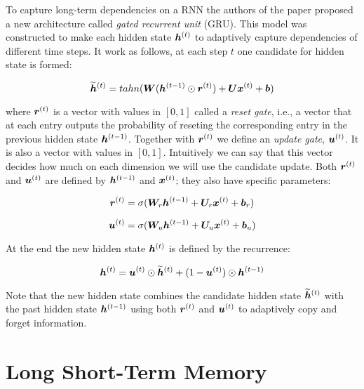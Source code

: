 To capture long-term dependencies on a RNN  the authors of the paper \cite{ChungGCB14}  proposed a new architecture called \textit{gated recurrent unit} (GRU). This model was constructed to make each hidden state  $\bm{h}^{(t)}$ to adaptively capture dependencies of different time steps. It work as follows, at each step $t$ one candidate for hidden state is formed:

\begin{equation}
\bm{\widetilde{h}}^{(t)} = tahn(\bm{W} (\bm{h}^{(t-1)} \odot  \bm{r}^{(t)}) + \bm{U} \bm{x}^{(t)} + \bm{b})
\end{equation}


where $\bm{r}^{(t)}$ is a vector with values in $[0, 1]$ called a \textit{reset gate}, i.e.,  a vector that at each entry outputs the probability of reseting the  corresponding entry in the previous hidden state $\bm{h}^{(t-1)}$. Together with $\bm{r}^{(t)}$ we define an \textit{update gate}, $\bm{u}^{(t)}$. It is also a vector with values in $[0, 1]$. Intuitively we can say that this vector decides how much on each dimension we will use the candidate update. Both $\bm{r}^{(t)}$ and $\bm{u}^{(t)}$ are defined by $\bm{h}^{(t-1)}$ and $\bm{x}^{(t)}$; they also have specific parameters:

\begin{equation}
\bm{r}^{(t)} = \sigma(\bm{W}_{r} \bm{h}^{(t-1)} + \bm{U}_{r} \bm{x}^{(t)} + \bm{b}_{r})
\end{equation}


\begin{equation}
\bm{u}^{(t)} = \sigma(\bm{W}_{u} \bm{h}^{(t-1)} + \bm{U}_{u} \bm{x}^{(t)} + \bm{b}_{u})
\end{equation}

At the end the new hidden state $\bm{h}^{(t)}$ is defined by the recurrence:

\begin{equation}
\bm{h}^{(t)} = \bm{u}^{(t)} \odot \bm{\widetilde{h}}^{(t)} + (1 - \bm{u}^{(t)}) \odot \bm{h}^{(t-1)} 
\end{equation}

Note that the new hidden state combines the candidate hidden state $\bm{\widetilde{h}}^{(t)}$ with the past hidden state $\bm{h}^{(t-1)}$ using both $\bm{r}^{(t)}$ and $\bm{u}^{(t)}$ to adaptively copy and forget information.

\section{Long Short-Term Memory}
\label{sec:LSTM}


